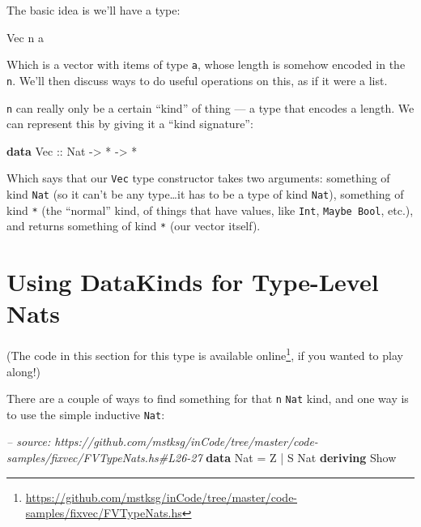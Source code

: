 \documentclass[]{article}
\newenvironment{Shaded}{}{}
\newcommand{\KeywordTok}[1]{\textcolor[rgb]{0.00,0.44,0.13}{\textbf{{#1}}}}
\newcommand{\DataTypeTok}[1]{\textcolor[rgb]{0.56,0.13,0.00}{{#1}}}
\newcommand{\CommentTok}[1]{\textcolor[rgb]{0.38,0.63,0.69}{\textit{{#1}}}}
\newcommand{\OtherTok}[1]{\textcolor[rgb]{0.00,0.44,0.13}{{#1}}}
\newcommand{\FunctionTok}[1]{\textcolor[rgb]{0.02,0.16,0.49}{{#1}}}
\newcommand{\NormalTok}[1]{{#1}}
\renewcommand{\href}[2]{#2\footnote{\url{#1}}}
\begin{document}
The basic idea is we'll have a type:

\begin{Shaded}
\begin{Highlighting}[]
\DataTypeTok{Vec} \NormalTok{n a}
\end{Highlighting}
\end{Shaded}

Which is a vector with items of type \texttt{a}, whose length is somehow
encoded in the \texttt{n}. We'll then discuss ways to do useful
operations on this, as if it were a list.

\texttt{n} can really only be a certain ``kind'' of thing --- a type
that encodes a length. We can represent this by giving it a ``kind
signature'':

\begin{Shaded}
\begin{Highlighting}[]
\KeywordTok{data} \DataTypeTok{Vec}\OtherTok{ ::} \DataTypeTok{Nat} \OtherTok{->} \FunctionTok{*} \OtherTok{->} \FunctionTok{*}
\end{Highlighting}
\end{Shaded}

Which says that our \texttt{Vec} type constructor takes two arguments:
something of kind \texttt{Nat} (so it can't be any type\ldots{}it has to
be a type of kind \texttt{Nat}), something of kind \texttt{*} (the
``normal'' kind, of things that have values, like \texttt{Int},
\texttt{Maybe\ Bool}, etc.), and returns something of kind \texttt{*}
(our vector itself).

\section{Using DataKinds for Type-Level
Nats}\label{using-datakinds-for-type-level-nats}

(The code in this section for this type is
\href{https://github.com/mstksg/inCode/tree/master/code-samples/fixvec/FVTypeNats.hs}{available
online}, if you wanted to play along!)

There are a couple of ways to find something for that \texttt{n}
\texttt{Nat} kind, and one way is to use the simple inductive
\texttt{Nat}:

\begin{Shaded}
\begin{Highlighting}[]
\CommentTok{-- source: https://github.com/mstksg/inCode/tree/master/code-samples/fixvec/FVTypeNats.hs#L26-27}
\KeywordTok{data} \DataTypeTok{Nat} \FunctionTok{=} \DataTypeTok{Z} \FunctionTok{|} \DataTypeTok{S} \DataTypeTok{Nat}
         \KeywordTok{deriving} \DataTypeTok{Show}
\end{Highlighting}
\end{Shaded}
\end{document}

